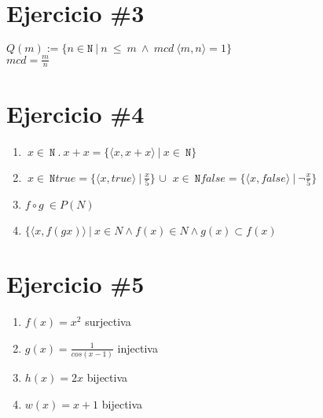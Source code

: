 \documentclass{article}
\begin{document}
\section*{Ejercicio \#3}

$Q(m):= \{ n \in \mathtt{N} \ |\ n \ \leq \  m \ \wedge \ mcd \ \langle m , n \rangle = 1  \}$ \\

 $mcd= \frac{m}{n}$

\section*{Ejercicio \#4}

\begin{enumerate}

    \item $ \ x \in \ \mathtt{N} \ . \ x + x = \{ \langle x , x+x \rangle \ |\ x \in \ \mathtt{N} \} $

    \item $\ x \in \ \mathtt{N} true =\{ \langle x , true \rangle \ |\ \frac{x}{5}\} $ $\cup$ $ \ x \in \ \mathtt{N} false =\{ \langle x , false \rangle \ |\ \neg \frac{x}{5}\}$

    \item $f\circ g \ \in P(N)$

    \item $\{ \langle x, f(gx) \rangle \ |\ x \in N \wedge f(x) \in N   \wedge g(x) \subset f(x)$

\end{enumerate} 

\section*{Ejercicio \#5}

\begin{enumerate}



\item{$f(x)=x^2$} surjectiva 



        \item{$g(x)=\frac{1}{cos(x-1)}$} injectiva



        \item{$h(x)=2x$} bijectiva



        \item{$w(x)=x+1$} bijectiva

\end{enumerate}
\end{document}
